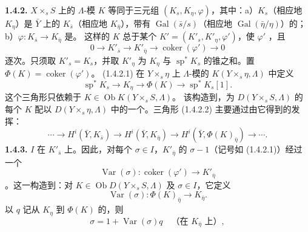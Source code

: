 \textbf{1.4.2.} $X\times_sS$ 上的 $\Lambda$-模 $K$ 等同于三元组 $(K_s,K_\eta,\varphi)$，其中：a）$K_s$（相应地 $K_\eta$）是 $\bar Y$ 上的 $K_{\bar s}$（相应地 $K_{\bar\eta}$），带有 $\operatorname{Gal}(\bar s/s)$（相应地 $\operatorname{Gal}(\bar\eta/\eta)$）的；b）$\varphi:K_{\bar s}\to K_{\bar\eta}$ 是。
这样的 $K$ 总于某个 $K'=(K'_s,K'_\eta,\varphi')$，使 $\varphi'$ ，且
\[0\longrightarrow K'_{\bar s}\longrightarrow K'_{\bar\eta}\longrightarrow\operatorname{coker}(\varphi')\longrightarrow0\tag{1.4.2.1}\]
逐次。只须取 $K'_s=K_s$，并取 $K'_\eta$ 为 $K_\eta$ 与 $\operatorname{sp}^*K_s$ 的锥之和。置 $\Phi(K)=\operatorname{coker}(\varphi')$。 (1.4.2.1) 在 $Y\times_s\eta$ 上 $\Lambda$-模的 $K(Y\times_s\eta,\Lambda)$ 中定义
\[\operatorname{sp}^*K_s\longrightarrow K_\eta\longrightarrow\Phi(K)\longrightarrow\operatorname{sp}^*K_s[1].\tag{1.4.2.2}\]
这个三角形只依赖于 $K\in\operatorname{Ob}K(Y\times_sS,\Lambda)$。
该构造到，为 $D(Y\times_sS,\Lambda)$ 的每个 $K$ 配以 $D(Y\times_s\eta,\Lambda)$ 中的一个。三角形 (1.4.2.2) 主要通过由它得到的发挥：
\[\cdots\longrightarrow H^i(\bar Y,K_{\bar s})\longrightarrow H^i(\bar Y,K_{\bar\eta})\longrightarrow H^i(\bar Y,\Phi(K)_{\bar\eta})\longrightarrow\cdots.\]
\textbf{1.4.3.}  $I$ 在 $K'_{\bar s}$ 上。因此，对每个 $\sigma\in I$，$K'_{\bar\eta}$ 的 $\sigma-1$（记号如 (1.4.2.1)）经过一个
\[\operatorname{Var}(\sigma):\operatorname{coker}(\varphi')\longrightarrow K'_{\bar\eta}\]
。这一构造到：对 $K\in\operatorname{Ob}D(Y\times_sS,\Lambda)$ 及 $\sigma\in I$，它定义
\[\operatorname{Var}(\sigma):\Phi(K)_{\bar\eta}\longrightarrow K_{\bar\eta}.\tag{1.4.3.1}\]
以 $q$ 记从 $K_\eta$ 到 $\Phi(K)$ 的，则
\[\sigma=1+\operatorname{Var}(\sigma)q\quad\text{（在 $K_{\bar\eta}$ 上）},\tag{1.4.3.2}\]
